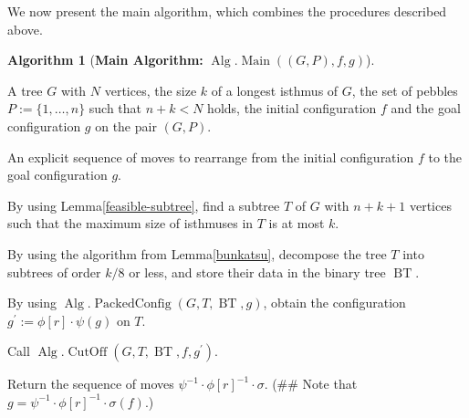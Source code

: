 \documentclass[letter,11pt]{article}
\theoremstyle{definition}
\theoremstyle{definition}
\newtheorem{alg}{Algorithm}
\DeclareMathOperator{\BT}{BT}
\DeclareMathOperator{\Alg}{Alg}
\DeclareMathOperator{\PacCon}{PackedConfig}
\DeclareMathOperator{\CutOff}{CutOff}
\DeclareMathOperator{\Main}{Main}
\newcommand{\1}{\boldmath$~1~$\unboldmath}
\newcommand{\tume}{\hspace*{0.2em}}
\newcommand{\maru}[1]{{\ooalign{\hfill$\small#1$\hfill\crcr\scalebox{1.3}{$\bigcirc$}}}}
\newenvironment{alg-enumerate}{%
  \begin{enumerate}%
   \renewcommand{\theenumi}{\arabic{enumi}}%
   \renewcommand{\labelenumi}{\rm{{\maru{\theenumi}}\tume\/}}%
   \renewcommand{\labelenumii}{\rm{$(${\maru{\theenumi}}-\theenumii$)$\tume\/}}%
 }{\end{enumerate}%
}
\newcommand{\namelistlabel}[1]{\hspace*{10pt}\mbox{#1}:\hspace{\fill}}
\newenvironment{namelist}[1]{%
    \begin{list}{}
      {\let\makelabel\namelistlabel
      \settowidth{\labelwidth}{#1}
      \setlength{\leftmargin}{1.1\labelwidth}
      \setlength{\labelsep}{5pt}
      \setlength{\parsep}{0pt}}
  }{%
  \end{list}}
\begin{document}

We now present the main algorithm, which combines the procedures described above.
\begin{alg}[{\bf Main Algorithm:} $\Alg.\Main((G,P), f, g)$]\hfill
\begin{namelist}{OUTPUT}
\item[\sl Input]{A tree $G$ with $N$ vertices, the size $k$ of a longest isthmus of $G$, the set of pebbles $P:=\{1,\ldots,n\}$ such that $n+k < N$ holds, the initial configuration $f$ and the goal configuration $g$ on the pair $(G,P)$.}
\item[\sl Output]{An explicit sequence of moves to rearrange from the initial configuration $f$ to the goal configuration $g$.}
\end{namelist}
\begin{alg-enumerate}
\item{By using Lemma\tume\ref{feasible-subtree}, find a subtree $T$ of $G$ with $n+k+1$ vertices such that the maximum size of isthmuses in $T$ is at most $k$.}
\item{By using the algorithm from Lemma\tume\ref{bunkatsu}, decompose the tree $T$ into subtrees of order $k/8$ or less, and store their data in the binary tree $\BT$.}
\item{By using $\Alg.\PacCon(G,T,\BT, g)$, obtain the configuration $g^{\prime}:=\phi[r]\cdot\psi(g)$ on $T$.}
\item{Call $\Alg.\CutOff(G,T,\BT,f,g^{\prime})$.}
\item{Return the sequence of moves $\psi^{-1}\cdot\phi[r]^{-1}\cdot\sigma$. (\#\# Note that $g=\psi^{-1}\cdot\phi[r]^{-1}\cdot\sigma(f)$.)}
\end{alg-enumerate}
\end{alg}
\end{document}
